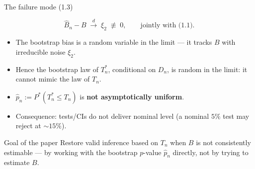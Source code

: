 \documentclass[10pt,aspectratio=169]{beamer}
\theoremstyle{plain}
\newcommand{\Pstar}{P^{*}}
\newcommand{\dto}{\xrightarrow{d}}
\newcommand{\Tn}{T_{n}}
\newcommand{\Tns}{T_{n}^{*}}
\newcommand{\Bnh}{\hat{B}_{n}}
\newcommand{\pnh}{\hat{p}_{n}}
\newcommand{\Dn}{D_{n}}
\begin{document}
\begin{frame}{The failure mode (1.3)}

  \[
    \Bnh - B \;\dto\; \xi_2 \;\not\equiv\; 0,
    \qquad \text{jointly with (1.1).}
    \tag{1.3}
  \]

  \medskip

  \begin{itemize}
    \setlength{\itemsep}{8pt}
    \item The bootstrap bias is a \alert{random variable in the limit} ---
      it tracks $B$ with irreducible noise $\xi_2$.
    \item Hence the bootstrap law of $\Tns$, conditional on $\Dn$, is
      \alert{random in the limit}: it cannot mimic the law of $\Tn$.
    \item $\pnh := \Pstar(\Tns \le \Tn)$ is \textbf{not asymptotically uniform}.
    \item Consequence: tests/CIs do not deliver nominal level
      (a nominal $5\%$ test may reject at $\sim 15\%$).
  \end{itemize}

  \medskip

  \begin{alertblock}{Goal of the paper}
    Restore valid inference based on $\Tn$ when $B$ is not consistently
    estimable --- by working with the bootstrap $p$-value $\pnh$ directly,
    not by trying to estimate $B$.
  \end{alertblock}

\end{frame}

\end{document}
